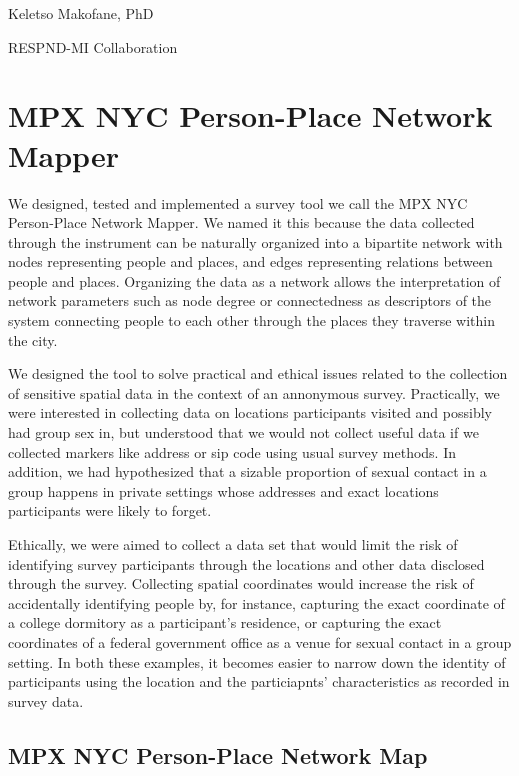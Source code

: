 \documentclass[
  letterpaper,
  DIV=11,
  numbers=noendperiod,
  oneside]{scrreprt}
\begin{document}
\leavevmode{}%
Keletso Makofane, PhD

RESPND-MI Collaboration

\hypertarget{mpx-nyc-person-place-network-mapper-1}{%
\section{MPX NYC Person-Place Network
Mapper}\label{mpx-nyc-person-place-network-mapper-1}}

We designed, tested and implemented a survey tool we call the MPX NYC
Person-Place Network Mapper. We named it this because the data collected
through the instrument can be naturally organized into a bipartite
network with nodes representing people and places, and edges
representing relations between people and places. Organizing the data as
a network allows the interpretation of network parameters such as node
degree or connectedness as descriptors of the system connecting people
to each other through the places they traverse within the city.

We designed the tool to solve practical and ethical issues related to
the collection of sensitive spatial data in the context of an annonymous
survey. Practically, we were interested in collecting data on locations
participants visited and possibly had group sex in, but understood that
we would not collect useful data if we collected markers like address or
sip code using usual survey methods. In addition, we had hypothesized
that a sizable proportion of sexual contact in a group happens in
private settings whose addresses and exact locations participants were
likely to forget.

Ethically, we were aimed to collect a data set that would limit the risk
of identifying survey participants through the locations and other data
disclosed through the survey. Collecting spatial coordinates would
increase the risk of accidentally identifying people by, for instance,
capturing the exact coordinate of a college dormitory as a participant's
residence, or capturing the exact coordinates of a federal government
office as a venue for sexual contact in a group setting. In both these
examples, it becomes easier to narrow down the identity of participants
using the location and the particiapnts' characteristics as recorded in
survey data.

\hypertarget{mpx-nyc-person-place-network-map}{%
\subsection{MPX NYC Person-Place Network
Map}\label{mpx-nyc-person-place-network-map}}
\end{document}
